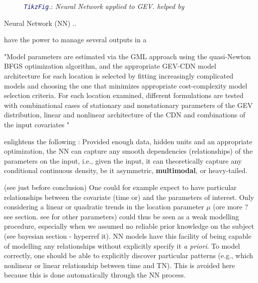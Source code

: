 \documentclass[11pt,a4paper,openany ]{book}
\begin{document}
\begin{figure}
\begin{center}
{{
		}
	}
	\vspace{-2.5mm}
	\caption{\tiny \textcolor{MidnightBlue}{\emph{\texttt{TikzFig}.}}:\emph{ Neural Network applied to GEV. helped by \textcolor{JungleGreen}{\cite{cannon_flexible_2010}}} }
	\end{center}
\end{figure}

Neural Network (NN) ..

have the power to manage several outputs in a 

"Model parameters are estimated via the GML approach using the
quasi-Newton BFGS optimization algorithm, and the appropriate GEV-CDN model architecture for
each location is selected by fitting increasingly complicated models and choosing the one that
minimizes appropriate cost-complexity model selection criteria. For each location examined, different
formulations are tested with combinational cases of stationary and nonstationary parameters of the
GEV distribution, linear and nonlinear architecture of the CDN and combinations of the input covariates "


\cite{carreau_hybrid_2009} enlightens the following : Provided enough data, hidden units and an appropriate optimization, the NN can capture any smooth dependencies (relationships) of the parameters on the input, i.e., given the input, it can theoretically capture any conditional continuous density, be it asymmetric, \textbf{multimodal}, or heavy-tailed.

(see \citet{cannon_flexible_2010} just before conclusion) 
One could for example expect to have particular relationships between the covariate (time or) and the parameters of interest. Only considering a linear or quadratic trends in the location parameter $\mu$ (ore more ? see section. see for other parameters) could thus be seen as a weak modelling procedure, especially when we assumed no reliable prior knowledge on the subject (see bayesian section - hyperref it).
NN models have this facility of being capable of modelling any relationships without explicitly specify it \emph{a priori}. To model correctly, one should be able to explicitly discover particular patterns (e.g., which nonlinear or linear relationship between time and TN). This is avoided here because this is done automatically through the NN process.
\end{document}
